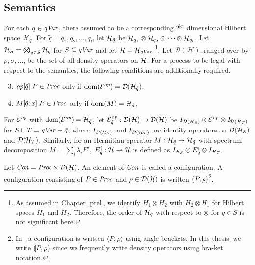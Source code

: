 \subsection{Semantics}
For each $q \in \mathit{qVar}$, there assumed to be a corresponding $2^{|q|}$
dimensional
Hilbert space $\mathcal{H}_q$.
For $\tilde q = q_1,q_2,...,q_l$, let $\mathcal{H}_{\tilde q}$ be $\mathcal{H}_{q_1}
\otimes \mathcal{H}_{q_2} \otimes \cdots \otimes \mathcal{H}_{q_l}$.
Let $\mathcal{H}_S=\bigotimes_{q \in {\it S}} \mathcal{H}_q$ for $S
\subseteq \mathit{qVar}$ and let $\mathcal{H} = \mathcal{H}_{\mathit{qVar}}$
\footnote{As assumed in Chapter \ref{prel}, we identify $H_1 \otimes
H_2$ with $H_2 \otimes H_1$ for Hilbert spaces $H_1$ and $H_2$.
Therefore, the order of $\mathcal{H}_{q}$ with respect to $\otimes$ for $q \in S$
is not significant here.}.
Let $\mathcal{D}(\mathcal{H})$, ranged over by $\rho, \sigma,...$, be the
set of all density operators on $\mathcal{H}$.
For a process to be legal with respect to 
the semantics, the following conditions are additionally required.
\begin{enumerate}
\setcounter{enumi}{2}
 \item $\mathit{op}[\tilde q].P \in \mathit{Proc}$
       only if $\mathrm{dom}(\mathcal{E}^{\mathit{op}}) =
       \mathcal{D}(\mathcal{H}_{\tilde q})$,
 \item $M[\tilde q;x].P \in \mathit{Proc}$ only if $\mathrm{dom}(M) = \mathcal{H}_{\tilde q}$,
\end{enumerate}
For $\mathcal{E}^{\mathit{op}}$ with $\mathrm{dom}(\mathcal{E}^{\mathit{op}}) = \mathcal{H}_{\tilde q}$,
let $\mathcal{E}^{\mathit{op}}_{\tilde q}:\mathcal{D}(\mathcal{H}) \rightarrow \mathcal{D}(\mathcal{H})$ be
$I_{\mathcal{D}(\mathcal{H}_S)} \otimes \mathcal{E}^{\mathit{op}} \otimes I_{\mathcal{D}(\mathcal{H}_T)}$
for $S \cup T =
\mathit{qVar} - \tilde q$, where $I_{\mathcal{D}(\mathcal{H}_S)}$ and $I_{\mathcal{D}(\mathcal{H}_T)}$ are identity
operators on
$\mathcal{D}(\mathcal{H}_{S})$ and $\mathcal{D}(\mathcal{H}_{T})$.
Similarly, for an Hermitian operator $M:\mathcal{H}_{\tilde q} \rightarrow
\mathcal{H}_{\tilde q}$ with spectrum decomposition $M = \sum_{i} \lambda_i E^i$,
$E^i_{\tilde q}:\mathcal{H} \rightarrow \mathcal{H}$ is defined as
$I_{\mathcal{H}_S} \otimes E^i_{\tilde q} \otimes I_{\mathcal{H}_T}$.

Let $\mathit{Con} = \mathit{Proc} \times \mathcal{D}(\mathcal{H})$. An
element of $\mathit{Con}$ is called a configuration.
A configuration consisting of $P \in \mathit{Proc}$ and $\rho \in \mathcal{D}(\mathcal{H})$
is written $\llparenthesis P, \rho \rrparenthesis$\footnote{In \cite{FengDuanJiYing2007,
Ying2009, FengDuanYing2011, DengFeng2012,
FengDengYing2012}, a configuration is written
$\langle P, \rho \rangle$ using angle brackets. In this thesis,
we write $\llparenthesis P, \rho \rrparenthesis$ since we frequently write density operators using
bra-ket notation.}.

